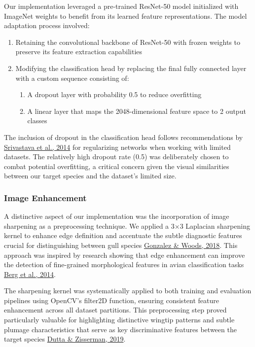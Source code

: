 \documentclass[a4paper,12pt]{article}
\begin{document}
Our implementation leveraged a pre-trained ResNet-50 model initialized with ImageNet weights to benefit from its learned feature representations. The model adaptation process involved:

\begin{enumerate}
    \item Retaining the convolutional backbone of ResNet-50 with frozen weights to preserve its feature extraction capabilities
    \item Modifying the classification head by replacing the final fully connected layer with a custom sequence consisting of:
    \begin{enumerate}
        \item A dropout layer with probability 0.5 to reduce overfitting
        \item A linear layer that maps the 2048-dimensional feature space to 2 output classes
    \end{enumerate}
\end{enumerate}

The inclusion of dropout in the classification head follows recommendations by {\href{https://jmlr.org/papers/v15/srivastava14a.html}{Srivastava et al., 2014}} for regularizing networks when working with limited datasets. The relatively high dropout rate (0.5) was deliberately chosen to combat potential overfitting, a critical concern given the visual similarities between our target species and the dataset's limited size.

\subsubsection{Image Enhancement}

A distinctive aspect of our implementation was the incorporation of image sharpening as a preprocessing technique. We applied a 3×3 Laplacian sharpening kernel to enhance edge definition and accentuate the subtle diagnostic features crucial for distinguishing between gull species {\href{https://www.pearson.com/en-us/subject-catalog/p/digital-image-processing/P200000003546}{Gonzalez \& Woods, 2018}}. This approach was inspired by research showing that edge enhancement can improve the detection of fine-grained morphological features in avian classification tasks {\href{https://openaccess.thecvf.com/content_cvpr_2014/papers/Berg_Birdsnap_Large-scale_Fine-grained_2014_CVPR_paper.pdf}{Berg et al., 2014}}.

The sharpening kernel was systematically applied to both training and evaluation pipelines using OpenCV's filter2D function, ensuring consistent feature enhancement across all dataset partitions. This preprocessing step proved particularly valuable for highlighting distinctive wingtip patterns and subtle plumage characteristics that serve as key discriminative features between the target species {\href{https://ieeexplore.ieee.org/document/8659085}{Dutta \& Zisserman, 2019}}.
\end{document}
